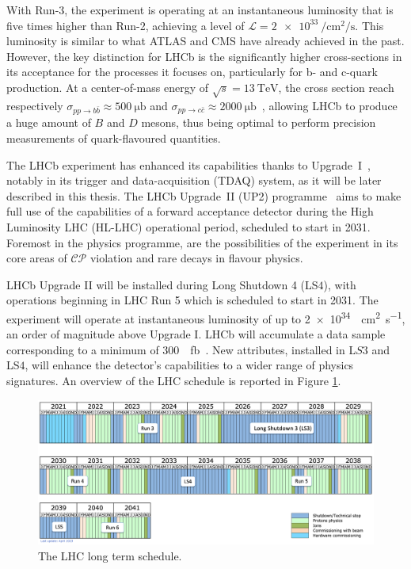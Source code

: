 With Run-3, the experiment is operating at an instantaneous luminosity that is five times higher than Run-2, achieving a level of $\mathcal{L}=\SI{2e33}{\per\centi\meter\squared\per\second}$. This luminosity is similar to what ATLAS and CMS have already achieved in the past. However, the key distinction for LHCb is the significantly higher cross-sections in its acceptance for the processes it focuses on, particularly for b- and c-quark production. At a center-of-mass energy of $\sqrt{s}=\SI{13}{\tera\eV}$, the cross section reach respectively $\sigma_{pp\rightarrow b\bar{b}}\approx\SI{500}{\micro\barn}$ and $\sigma_{pp\rightarrow c\bar{c}}\approx\SI{2000}{\micro\barn}$~\cite{bCrossSection, Aaij:2057627}, allowing LHCb to produce a huge amount of $B$ and $D$ mesons, thus being optimal to perform precision measurements of quark-flavoured quantities.

The LHCb experiment has enhanced its capabilities thanks to Upgrade~I~\cite{lhcbcollaboration2023lhcb}, notably in its trigger and data-acquisition (TDAQ) system, as it will be later described in this thesis. 
The LHCb Upgrade~II (UP2) programme~\cite{CERN-LHCC-2021-012} aims to make full use of the capabilities of a forward acceptance detector during the High Luminosity LHC (HL-LHC) operational period, scheduled to start in 2031. Foremost in the physics programme, are the possibilities of the experiment in its core areas of $\mathcal{CP}$ violation and rare decays in flavour physics.

LHCb Upgrade II will be installed during Long Shutdown 4 (LS$4$), with operations beginning in LHC Run 5 which is scheduled to start in 2031. The experiment will operate at instantaneous luminosity of up to \SI{2e34}{\per\centi\meter\squared\per\second}, an order of magnitude above Upgrade I. LHCb will accumulate a data sample corresponding to a minimum of \SI{300}{\per\femto\barn}~\cite{Efthymiopoulos:2319258}. New attributes, installed in L$S3$ and LS$4$, will enhance the detector’s capabilities to a wider range of physics signatures. An overview of the LHC schedule is reported in Figure \ref{fig:LHC_schedule}.

\begin{figure}
    \centering
    \includegraphics[width=\textwidth]{figures/LHC-long-term-Apr23.png}
    \caption{The LHC long term schedule.}
    \label{fig:LHC_schedule}
\end{figure}


